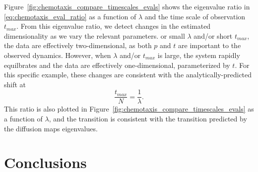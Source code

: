 \documentclass[preprint]{elsarticle}
\begin{document}
Figure~\ref{fig:chemotaxis_compare_timescales_evals} shows the eigenvalue ratio in \eqref{eq:chemotaxis_eval_ratio} as a function of $\lambda$ and the time scale of observation $t_{max}$.
%
From this eigenvalue ratio, we detect changes in the estimated dimensionality as we vary the relevant parameters.
%
or small $\lambda$ and/or short $t_{max}$, the data are effectively two-dimensional, as both $p$ and $t$ are important to the observed dynamics. 
%
However, when $\lambda$ and/or $t_{max}$ is large, the system rapidly equilbrates and the data are effectively one-dimensional, parameterized by $t$. 
%
%
%
For this specific example, these changes are consistent with the analytically-predicted shift at 
\begin{equation}
\frac{t_{max}}{N} = \frac{1}{\lambda}.
\end{equation} 
%
This ratio is also plotted in Figure~\ref{fig:chemotaxis_compare_timescales_evals} as a function of $\lambda$, and the transition is consistent with the transition predicted by the diffusion maps eigenvalues. 


\section{Conclusions}
\end{document}
